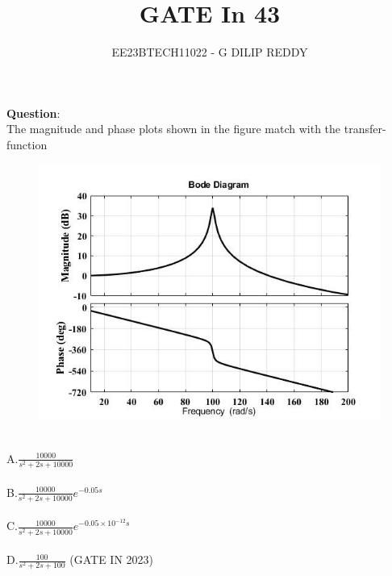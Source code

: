 \documentclass[journal,12pt,twocolumn]{IEEEtran}
\theoremstyle{remark}
\begin{document}

\vspace{3cm}

\title{GATE In 43}
\author{EE23BTECH11022 - G DILIP REDDY}
\maketitle
\newpage

\bigskip

\renewcommand{\thefigure}{\arabic{figure}}
\renewcommand{\thetable}{\arabic{table}}
\textbf{Question}:\\
The magnitude and phase plots shown in the figure match with the transfer-
function
\begin{figure}[h]
    \centering
    \includegraphics[width=1.1\linewidth]{figs/question.png}
\end{figure}\\
A.$\frac{10000}{s^2+2s+10000}$\\\\
B.$\frac{10000}{s^2+2s+10000}e^{-0.05s}$\\\\
C.$\frac{10000}{s^2+2s+10000}e^{-0.05\times10^{-12}s}$\\\\
D.$\frac{100}{s^2+2s+100}$
\hfill{(GATE IN 2023)}
\\\\
\solution
\end{document}
